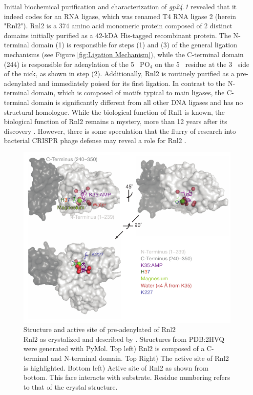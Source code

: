 Initial biochemical purification and characterization of \textit{gp24.1} \citep{Ho2002b} revealed that it indeed codes for an RNA ligase, which was renamed T4 RNA ligase 2 (herein "Rnl2"). Rnl2 is a 374 amino acid monomeric protein composed of 2 distinct domains initially purified as a 42-kDA His-tagged recombinant protein. The N-terminal domain (1) is responsible for steps (1) and (3) of the general ligation mechanisms (see Figure \ref{fig:Ligation Mechanism}), while the C-terminal domain (244) is responsible for adenylation of the 5\textprime~ PO$_{4}$ on the 5\textprime~ residue at the 3\textprime~ side of the nick, as shown in step (2). Additionally, Rnl2 is routinely purified as a pre-adenylated and immediately poised for its first ligation. In contrast to the N-terminal domain, which is composed of motifs typical to main ligases, the C-terminal domain is significantly	different from all other DNA ligases and has no structural homologue. While the biological function of Rnl1 is known, the biological function of Rnl2 remains a mystery, more than 12 years after its discovery \citep{Chauleau2013b}. However, there is some speculation that the flurry of research into bacterial CRISPR phage defense may reveal a role for Rnl2 \citep{Barrangou2007c,Chauleau2013b}.

\begin{figure}[htbp]
	\centering 
	\includegraphics{Figures/Chapter1/Rnl2_Structure.pdf}
	\caption[Structure and active site of pre-adenylated of Rnl2]
	{
		Structure and active site of pre-adenylated of Rnl2\\[0.25cm]
		Rnl2 as crystalized and described by \citep{Nandakumar2006}. Structures from PDB:2HVQ were generated with PyMol. Top left) Rnl2 is composed of a C-terminal and N-terminal domain. Top Right) The active site of Rnl2 is highlighted. Bottom left) Active site of Rnl2 as shown from bottom. This face interacts with substrate. Residue numbering refers to that of the crystal structure.
	}
	\label{fig:Rnl2 General Structure}
\end{figure}

